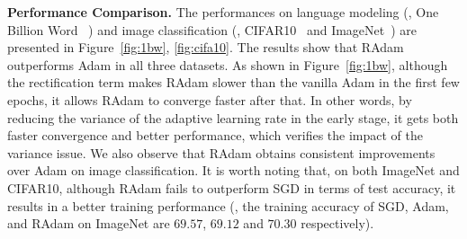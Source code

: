 \noindent
\textbf{Performance Comparison.}
The performances on language modeling (\ie, One Billion Word~
\citep{Chelba2013OneBW}) and image classification (\ie, CIFAR10~\citep{krizhevsky2009learning} and ImageNet~\citep{deng2009imagenet}) are 
presented in Figure~\ref{fig:1bw}, \ref{fig:cifa10}. %
The results show that RAdam outperforms Adam in all three datasets.
As shown in Figure~\ref{fig:1bw}, although the rectification term makes RAdam slower than the vanilla Adam in the first few epochs, it allows RAdam to converge faster after that. %
In other words, by reducing the variance of the adaptive learning rate in the early stage, it gets both faster convergence and better performance, which verifies the impact of the variance issue. 
We also observe that RAdam obtains consistent improvements over Adam on image classification.
It is worth noting that, on both ImageNet and CIFAR10, although RAdam fails to outperform SGD in terms of test accuracy, it results in a better training performance (\eg, the training accuracy of SGD, Adam, and RAdam on ImageNet are $69.57$, $69.12$ and $70.30$ respectively). 





